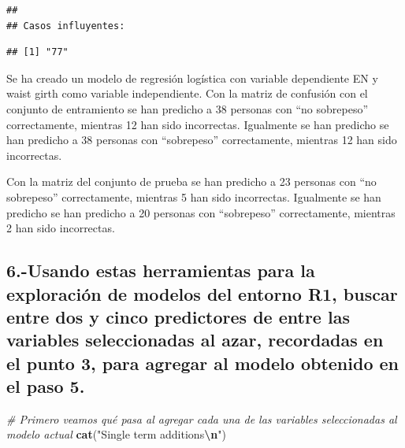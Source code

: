 \documentclass[
]{article}
\newenvironment{Shaded}{\begin{snugshade}}{\end{snugshade}}
\newcommand{\CommentTok}[1]{\textcolor[rgb]{0.56,0.35,0.01}{\textit{#1}}}
\newcommand{\FunctionTok}[1]{\textcolor[rgb]{0.13,0.29,0.53}{\textbf{#1}}}
\newcommand{\NormalTok}[1]{#1}
\newcommand{\SpecialCharTok}[1]{\textcolor[rgb]{0.81,0.36,0.00}{\textbf{#1}}}
\newcommand{\StringTok}[1]{\textcolor[rgb]{0.31,0.60,0.02}{#1}}
\begin{document}
\begin{verbatim}
## 
## Casos influyentes:
\end{verbatim}

\begin{Shaded}
\end{Shaded}

\begin{verbatim}
## [1] "77"
\end{verbatim}

Se ha creado un modelo de regresión logística con variable dependiente
EN y waist girth como variable independiente. Con la matriz de confusión
con el conjunto de entramiento se han predicho a 38 personas con ``no
sobrepeso'' correctamente, mientras 12 han sido incorrectas. Igualmente
se han predicho se han predicho a 38 personas con ``sobrepeso''
correctamente, mientras 12 han sido incorrectas.

Con la matriz del conjunto de prueba se han predicho a 23 personas con
``no sobrepeso'' correctamente, mientras 5 han sido incorrectas.
Igualmente se han predicho se han predicho a 20 personas con
``sobrepeso'' correctamente, mientras 2 han sido incorrectas.

\subsection{6.-Usando estas herramientas para la exploración de modelos
del entorno R1, buscar entre dos y cinco predictores de entre las
variables seleccionadas al azar, recordadas en el punto 3, para agregar
al modelo obtenido en el paso
5.}\label{usando-estas-herramientas-para-la-exploraciuxf3n-de-modelos-del-entorno-r1-buscar-entre-dos-y-cinco-predictores-de-entre-las-variables-seleccionadas-al-azar-recordadas-en-el-punto-3-para-agregar-al-modelo-obtenido-en-el-paso-5.}

\begin{Shaded}
\begin{Highlighting}[]
\CommentTok{\# Primero veamos qué pasa al agregar cada una de las variables seleccionadas al modelo actual}
\FunctionTok{cat}\NormalTok{(}\StringTok{"Single term additions}\SpecialCharTok{\textbackslash{}n}\StringTok{"}\NormalTok{)}
\end{Highlighting}
\end{Shaded}
\end{document}
